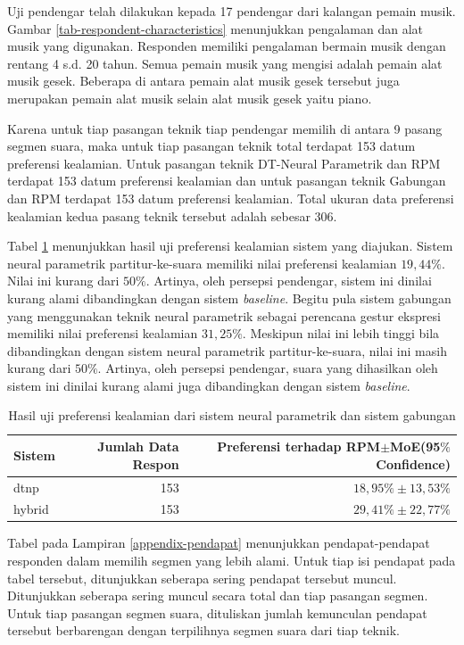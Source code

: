 Uji pendengar telah dilakukan kepada 17 pendengar dari kalangan pemain musik. Gambar \ref{tab-respondent-characteristics} menunjukkan pengalaman dan alat musik yang digunakan. Responden memiliki pengalaman bermain musik dengan rentang 4 s.d. 20 tahun. Semua pemain musik yang mengisi adalah pemain alat musik gesek. Beberapa di antara pemain alat musik gesek tersebut juga merupakan pemain alat musik selain alat musik gesek yaitu piano.

Karena untuk tiap pasangan teknik tiap pendengar memilih di antara 9 pasang segmen suara, maka untuk tiap pasangan teknik total terdapat 153 datum preferensi kealamian. Untuk pasangan teknik DT-Neural Parametrik dan RPM terdapat 153 datum preferensi kealamian dan untuk pasangan teknik Gabungan dan RPM terdapat 153 datum preferensi kealamian. Total ukuran data preferensi kealamian kedua pasang teknik tersebut adalah sebesar 306.

Tabel \ref{tab-preference} menunjukkan hasil uji preferensi kealamian sistem yang diajukan. Sistem neural parametrik partitur-ke-suara memiliki nilai preferensi kealamian $19,44\%$. Nilai ini kurang dari $50\%$. Artinya, oleh persepsi pendengar, sistem ini dinilai kurang alami dibandingkan dengan sistem \textit{baseline}. Begitu pula sistem gabungan yang menggunakan teknik neural parametrik sebagai perencana gestur ekspresi memiliki nilai preferensi kealamian $31,25\%$. Meskipun nilai ini lebih tinggi bila dibandingkan dengan sistem neural parametrik partitur-ke-suara, nilai ini masih kurang dari $50\%$. Artinya, oleh persepsi pendengar, suara yang dihasilkan oleh sistem ini dinilai kurang alami juga dibandingkan dengan sistem \textit{baseline}.

\begin{table}[htbp] %
  \begin{center}
    \caption{Hasil uji preferensi kealamian dari sistem neural parametrik dan sistem gabungan}
    \label{tab-preference}
    \begin{tabular}{|l|r|r|}
    \hline
	Sistem&Jumlah Data Respon&Preferensi terhadap RPM$\pm$MoE(95$\%$ Confidence)\\
	\hline
	dtnp&	153&	$18,95\%\pm13,53\%$\\\hline
	hybrid&	153&	$29,41\%\pm22,77\%$\\\hline
	\end{tabular}
  \end{center}
\end{table}

Tabel pada Lampiran \ref{appendix-pendapat} menunjukkan pendapat-pendapat responden dalam memilih segmen yang lebih alami. Untuk tiap isi pendapat pada tabel tersebut, ditunjukkan seberapa sering pendapat tersebut muncul. Ditunjukkan seberapa sering muncul secara total dan tiap pasangan segmen. Untuk tiap pasangan segmen suara, dituliskan jumlah kemunculan pendapat tersebut berbarengan dengan terpilihnya segmen suara dari tiap teknik.

